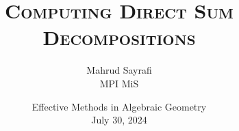 \documentclass[beamer]{paper}
\begin{document}
\rmfamily
{}

\title[Computing Direct Sum Decompositions]
      {\textsc{Computing Direct Sum Decompositions}} %



\newcommand{\lc}{\MakeLowercase}
\author[Mahrud Sayrafi]{M\lc{ahrud} S\lc{ayrafi} \\
  {\footnotesize MPI MiS}}%


\date{{\footnotesize Effective Methods in Algebraic Geometry \\ July 30, 2024}}

\frame[plain]{\titlepage}
\end{document}
